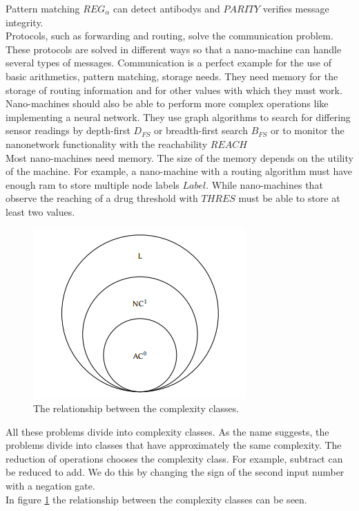 \documentclass[10pt,sigconf]{acmart}
\begin{document}
Pattern matching $REG_{\alpha}$ can detect antibodys and $PARITY$ verifies message integrity.\\
Protocols, such as forwarding and routing, solve the communication problem. 
These protocols are solved in different ways so that a nano-machine can handle several types of messages.
Communication is a perfect example for the use of basic arithmetics, pattern matching, storage needs.
They need memory for the storage of routing information and for other values with which they must work.\\
Nano-machines should also be able to perform more complex operations like implementing a neural network.
They use graph algorithms to search for differing sensor readings by depth-first $D_{FS}$ or breadth-first search $B_{FS}$ or to monitor the nanonetwork functionality with the reachability $REACH$\\
Most nano-machines need memory. The size of the memory depends on the utility of the machine.
For example, a nano-machine with a routing algorithm must have enough ram to store multiple node labels $Label$.
While nano-machines that observe the reaching of a drug threshold with $THRES$ must be able to store at least two values.\\
\begin{figure}[h!]
  \centering
  \includegraphics[scale=1]{ComplexityClasses.PNG}
\caption[]{The relationship between the complexity classes.\cite{lau2017computational}}
\label{complex}
\end{figure}
All these problems divide into complexity classes.
As the name suggests, the problems divide into classes that have approximately the same complexity.
The reduction of operations chooses the complexity class. For example, subtract can be reduced to add. 
We do this by changing the sign of the second input number with a negation gate. \\
In figure \ref{complex} the relationship between the complexity classes can be seen.
\end{document}
